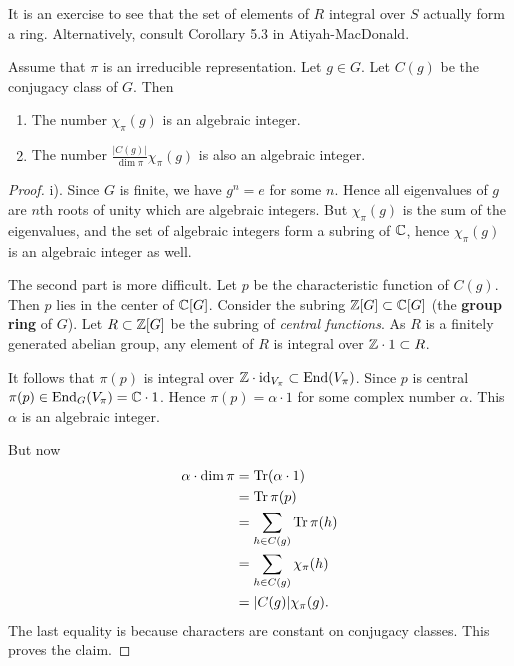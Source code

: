 \documentclass[11pt, english]{article}
\begin{document}
It is an exercise to see that the set of elements of $R$ integral over $S$ actually form a ring. Alternatively, consult Corollary 5.3 in Atiyah-MacDonald.

\begin{prop}
 Assume that $\pi$ is an irreducible representation. Let $g \in G$. Let $C(g)$ be the conjugacy class of $G$. Then
 \begin{enumerate}
 \item The number $\chi_\pi(g)$ is an algebraic integer.
\item The number $\frac{\lvert C(g) \rvert}{\dim \pi} \chi_\pi(g)$ is also an algebraic integer.
 \end{enumerate}
\end{prop}
\begin{proof}
i). Since $G$ is finite, we have $g^n=e$ for some $n$. Hence all eigenvalues of $g$ are $n$th roots of unity which are algebraic integers. But $\chi_\pi(g)$ is the sum of the eigenvalues, and the set of algebraic integers form a subring of $\mathbb{C}$, hence $\chi_\pi(g)$ is an algebraic integer as well.

The second part is more difficult. Let $p$ be the characteristic function of $C(g)$. Then $p$ lies in the center of $\mathbb{C}[G]$. Consider the subring $\mathbb{Z}[G] \subset \mathbb{C}[G]$ (the \textbf{group ring} of $G$). Let $R \subset \mathbb{Z}[G]$ be the subring of \emph{central functions}. As $R$ is a finitely generated abelian group, any element of $R$ is integral over $\mathbb{Z} \cdot 1 \subset R$. 

It follows that $\pi(p)$ is integral over $\mathbb{Z} \cdot \text{id}_{V_\pi} \subset \operatorname{End}(V_\pi)$. Since $p$ is central $\pi(p) \in \operatorname{End}_G(V_\pi)=\mathbb{C} \cdot 1$. Hence $\pi(p) = \alpha \cdot 1$ for some complex number $\alpha$. This $\alpha$ is an algebraic integer.

But now
\begin{align*}
  \alpha \cdot \dim \pi &= \operatorname{Tr}( \alpha \cdot 1) \\
&= \operatorname{Tr} \pi(p) \\
&= \sum_{h \in C(g)} \operatorname{Tr} \pi(h) \\
&= \sum_{h \in C(g)} \chi_\pi(h) \\
&= \lvert C(g) \rvert \chi_\pi(g).
\end{align*}
The last equality is because characters are constant on conjugacy classes. This proves the claim.
\end{proof}
\end{document}
